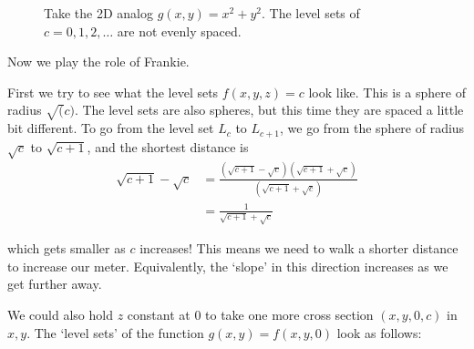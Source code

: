  \begin{figure}
    \centering
    \caption{Take the 2D analog $g(x,y)=x^2+y^2$. The level sets of $c=0,1,2,\ldots$ are not evenly spaced.}
\end{figure}
Now we play the role of Frankie. 

First we try to see what the level sets $f(x,y,z)=c$ look like. This is a sphere of radius $\sqrt(c)$. The level sets are also spheres, but this time they are spaced a little bit different. To go from the level set $L_c$ to $L_{c+1}$, we go from the sphere of radius $\sqrt{c}$ to $\sqrt{c+1}$, and the shortest distance is  \begin{align*}
    \sqrt{c+1}-\sqrt{c}&=  \frac{(\sqrt{c+1}-\sqrt{c})(\sqrt{c+1}+\sqrt{c})}{(\sqrt{c+1}+\sqrt{c})}\\ &= \frac{1}{\sqrt{c+1}+\sqrt{c}}
\end{align*}

which gets smaller as $c$ increases! This means we need to walk a shorter distance to increase our meter. Equivalently, the `slope' in this direction increases as we get further away.

We could also hold $z$ constant at $0$ to take one more cross section $(x,y,0,c)$ in $x,y$. The `level sets' of the function $g(x,y)=f(x,y,0)$ look as follows:




